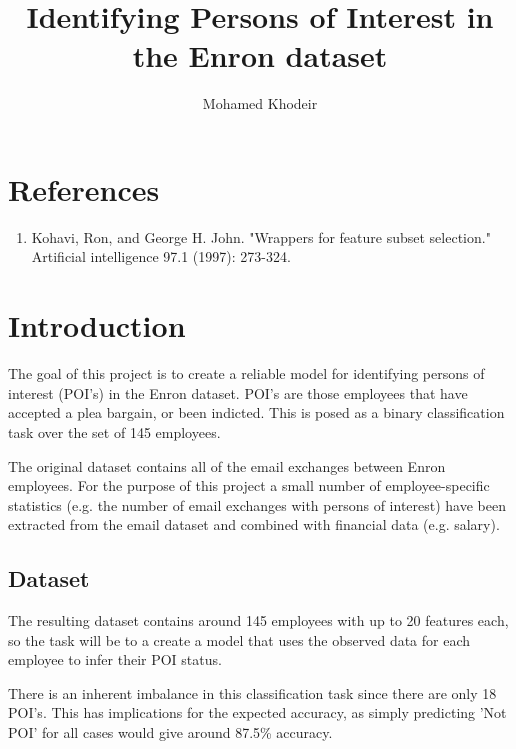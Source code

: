 \documentclass{article}
\begin{document}
\renewcommand\thesection{\arabic{section}}
\author{Mohamed Khodeir}
\title{Identifying Persons of Interest in the Enron dataset}


\maketitle
\section{References}
\begin{enumerate}
\item{Kohavi, Ron, and George H. John. "Wrappers for feature subset selection." Artificial intelligence 97.1 (1997): 273-324.}

\end{enumerate}


\section{Introduction}

The goal of this project is to create a reliable model for identifying persons of interest (POI's) in the Enron dataset. POI's are those employees that have accepted a plea bargain, or been indicted. This is posed as a binary classification task over the set of 145 employees.

The original dataset contains all of the email exchanges between Enron employees. For the purpose of this project a small number of employee-specific statistics (e.g. the number of email exchanges with persons of interest) have been extracted from the email dataset and combined with financial data (e.g. salary).

\subsection{Dataset}

The resulting dataset contains around 145 employees with up to 20 features each, so the task will be to a create a model that uses the observed data for each employee to infer their POI status. 


There is an inherent imbalance in this classification task since there are only 18 POI's. This has implications for the expected accuracy, as simply predicting 'Not POI' for all cases would give around 87.5\% accuracy.
\end{document}

